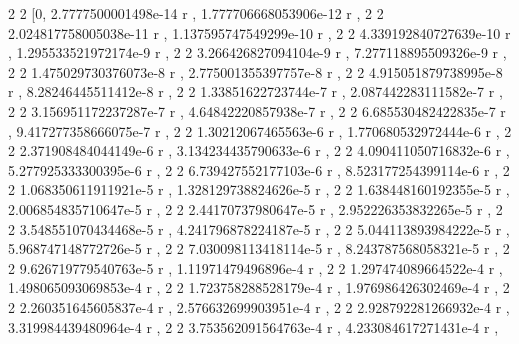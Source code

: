 \documentclass[a4paper,10pt]{article}
\begin{document}
\begin{eulernotebook}
\begin{euleroutput}
                                   2                         2
          [0, 2.7777500001498e-14 r , 1.777706668053906e-12 r , 
                         2                         2
  2.024817758005038e-11 r , 1.137595747549299e-10 r , 
                         2                        2
  4.339192840727639e-10 r , 1.295533521972174e-9 r , 
                        2                        2
  3.266426827094104e-9 r , 7.277118895509326e-9 r , 
                        2                        2
  1.475029730376073e-8 r , 2.775001355397757e-8 r , 
                        2                       2
  4.915051879738995e-8 r , 8.28246445511412e-8 r , 
                       2                        2
  1.33851622723744e-7 r , 2.087442283111582e-7 r , 
                        2                       2
  3.156951172237287e-7 r , 4.64842220857938e-7 r , 
                        2                        2
  6.685530482422835e-7 r , 9.417277358666075e-7 r , 
                       2                        2
  1.30212067465563e-6 r , 1.770680532972444e-6 r , 
                        2                        2
  2.371908484044149e-6 r , 3.134234435790633e-6 r , 
                        2                        2
  4.090411050716832e-6 r , 5.277925333300395e-6 r , 
                        2                        2
  6.739427552177103e-6 r , 8.523177254399114e-6 r , 
                        2                        2
  1.068350611911921e-5 r , 1.328129738824626e-5 r , 
                        2                        2
  1.638448160192355e-5 r , 2.006854835710647e-5 r , 
                       2                        2
  2.44170737980647e-5 r , 2.952226353832265e-5 r , 
                        2                        2
  3.548551070434468e-5 r , 4.241796878224187e-5 r , 
                        2                        2
  5.044113893984222e-5 r , 5.968747148772726e-5 r , 
                        2                        2
  7.030098113418114e-5 r , 8.243787568058321e-5 r , 
                        2                       2
  9.626719779540763e-5 r , 1.11971479496896e-4 r , 
                        2                        2
  1.297474089664522e-4 r , 1.498065093069853e-4 r , 
                        2                        2
  1.723758288528179e-4 r , 1.976986426302469e-4 r , 
                        2                        2
  2.260351645605837e-4 r , 2.576632699903951e-4 r , 
                        2                        2
  2.928792281266932e-4 r , 3.319984439480964e-4 r , 
                        2                        2
  3.753562091564763e-4 r , 4.233084617271431e-4 r , 

\end{euleroutput}
\end{eulernotebook}
\end{document}

